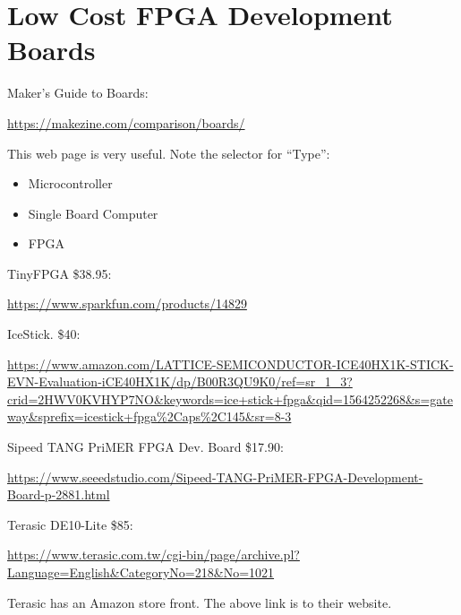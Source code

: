 \section{Low Cost FPGA Development Boards}

Maker's Guide to Boards:

\url{https://makezine.com/comparison/boards/}

This web page is very useful.  Note the selector for ``Type'':

\begin{itemize}
	\item Microcontroller
    \item Single Board Computer
    \item FPGA
\end{itemize}


TinyFPGA \$38.95:

\url{https://www.sparkfun.com/products/14829}

IceStick.  \$40:

\url{https://www.amazon.com/LATTICE-SEMICONDUCTOR-ICE40HX1K-STICK-EVN-Evaluation-iCE40HX1K/dp/B00R3QU9K0/ref=sr_1_3?crid=2HWV0KVHYP7NO&keywords=ice+stick+fpga&qid=1564252268&s=gateway&sprefix=icestick+fpga%2Caps%2C145&sr=8-3}

Sipeed TANG PriMER FPGA Dev. Board \$17.90:

\url{https://www.seeedstudio.com/Sipeed-TANG-PriMER-FPGA-Development-Board-p-2881.html}

Terasic DE10-Lite \$85:

\url{https://www.terasic.com.tw/cgi-bin/page/archive.pl?Language=English&CategoryNo=218&No=1021}

Terasic has an Amazon store front.  The above link is to their website.

